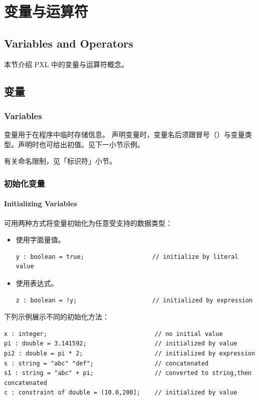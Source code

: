 \section{变量与运算符}
\subsection*{Variables and Operators}

本节介绍 PXL 中的变量与运算符概念。

\subsection{变量}
\subsubsection*{Variables}

变量用于在程序中临时存储信息。
声明变量时，变量名后须跟冒号（\cmd{:}）与变量类型。声明时也可给出初值。见下一小节示例。

\begin{noteBox}
有关命名限制，见「标识符」小节。
\end{noteBox}

\subsubsection{初始化变量}
\paragraph*{Initializing Variables}

可用两种方式将变量初始化为任意受支持的数据类型：
\begin{itemize}
  \item 使用字面量值。
\begin{lstlisting}[style=pxl]
y : boolean = true;                   // initialize by literal value
\end{lstlisting}
  \item 使用表达式。
\begin{lstlisting}[style=pxl]
z : boolean = !y;                     // initialized by expression
\end{lstlisting}
\end{itemize}

下列示例展示不同的初始化方法：
\begin{lstlisting}[style=pxl]
x : integer;                              // no initial value
pi : double = 3.141592;                   // initialized by value
pi2 : double = pi * 2;                    // initialized by expression
s : string = "abc" "def";                 // concatenated
s1 : string = "abc" + pi;                 // converted to string,then concatenated
c : constraint of double = (10.0,200];    // initialized by value
\end{lstlisting}

